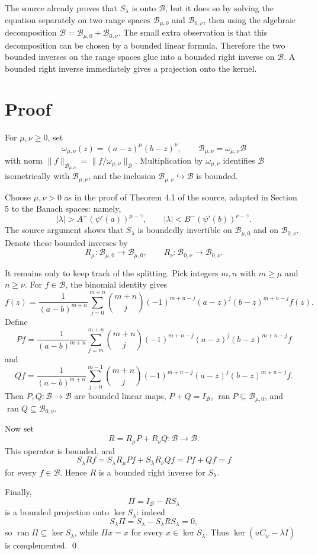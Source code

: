 \documentclass[11pt]{article}
\newcommand{\B}{\mathcal B}
\newcommand{\ran}{\operatorname{ran}}
\begin{document}
The source already proves that \(S_\lambda\) is onto \(\B\), but it does so by
solving the equation separately on two range spaces
\(\B_{\mu,0}\) and \(\B_{0,\nu}\), then using the algebraic decomposition
\(\B=\B_{\mu,0}+\B_{0,\nu}\).  The small extra observation is that this
decomposition can be chosen by a bounded linear formula.  Therefore the two
bounded inverses on the range spaces glue into a bounded right inverse on
\(\B\).  A bounded right inverse immediately gives a projection onto the
kernel.

\section*{Proof}

For \(\mu,\nu\ge0\), set
\[
  \omega_{\mu,\nu}(z)=(a-z)^\mu(b-z)^\nu,\qquad
  \B_{\mu,\nu}=\omega_{\mu,\nu}\B
\]
with norm \(\|f\|_{\B_{\mu,\nu}}=\|f/\omega_{\mu,\nu}\|_{\B}\).  Multiplication
by \(\omega_{\mu,\nu}\) identifies \(\B\) isometrically with
\(\B_{\mu,\nu}\), and the inclusion \(\B_{\mu,\nu}\hookrightarrow \B\) is
bounded.

Choose \(\mu,\nu>0\) as in the proof of Theorem 4.1 of the source, adapted in
Section 5 to the Banach spaces: namely,
\[
  |\lambda|>A^+(\psi'(a))^{\mu-\gamma},
  \qquad
  |\lambda|<B^-(\psi'(b))^{\nu-\gamma}.
\]
The source argument shows that \(S_\lambda\) is boundedly invertible on
\(\B_{\mu,0}\) and on \(\B_{0,\nu}\).  Denote these bounded inverses by
\[
  R_\mu:\B_{\mu,0}\to\B_{\mu,0},
  \qquad
  R_\nu:\B_{0,\nu}\to\B_{0,\nu}.
\]

It remains only to keep track of the splitting.  Pick integers \(m,n\) with
\(m\ge\mu\) and \(n\ge\nu\).  For \(f\in\B\), the binomial identity gives
\[
f(z)=\frac{1}{(a-b)^{m+n}}
 \sum_{j=0}^{m+n} \binom{m+n}{j}(-1)^{m+n-j}
 (a-z)^j(b-z)^{m+n-j}f(z).
\]
Define
\[
  Pf=\frac{1}{(a-b)^{m+n}}
 \sum_{j=m}^{m+n} \binom{m+n}{j}(-1)^{m+n-j}
 (a-z)^j(b-z)^{m+n-j}f
\]
and
\[
  Qf=\frac{1}{(a-b)^{m+n}}
 \sum_{j=0}^{m-1} \binom{m+n}{j}(-1)^{m+n-j}
 (a-z)^j(b-z)^{m+n-j}f .
\]
Then \(P,Q:\B\to\B\) are bounded linear maps, \(P+Q=I_\B\),
\(\ran P\subseteq\B_{\mu,0}\), and \(\ran Q\subseteq\B_{0,\nu}\).

Now set
\[
  R=R_\mu P+R_\nu Q:\B\to\B .
\]
This operator is bounded, and
\[
  S_\lambda Rf
  =S_\lambda R_\mu Pf+S_\lambda R_\nu Qf
  =Pf+Qf=f
\]
for every \(f\in\B\).  Hence \(R\) is a bounded right inverse for
\(S_\lambda\).

Finally,
\[
  \Pi=I_\B-RS_\lambda
\]
is a bounded projection onto \(\ker S_\lambda\): indeed
\[
  S_\lambda\Pi=S_\lambda-S_\lambda R S_\lambda=0,
\]
so \(\ran\Pi\subseteq\ker S_\lambda\), while \(\Pi x=x\) for every
\(x\in\ker S_\lambda\).  Thus \(\ker(uC_\psi-\lambda I)\) is complemented.
\qed
\end{document}
